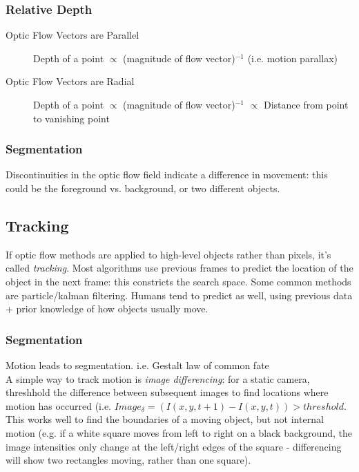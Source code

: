 \subsubsection{Relative Depth}
\begin{description}
    \item[Optic Flow Vectors are Parallel] Depth of a point $\propto$ (magnitude of flow vector)$^{-1}$ (i.e. motion parallax)
    \item[Optic Flow Vectors are Radial] Depth of a point $\propto$ (magnitude of flow vector)$^{-1}$ $\propto$ Distance from point to vanishing point
\end{description}

\subsubsection{Segmentation}
Discontinuities in the optic flow field indicate a difference in movement: this could be the foreground vs. background, or two different objects.

\subsection{Tracking}
If optic flow methods are applied to high-level objects rather than pixels, it's called \emph{tracking}. Most algorithms use previous frames to predict the location of the object in the next frame: this constricts the search space. Some common methods are particle/kalman filtering. Humans tend to predict as well, using previous data + prior knowledge of how objects usually move. 

\subsubsection{Segmentation}
Motion leads to segmentation. i.e. Gestalt law of common fate\\

A simple way to track motion is \emph{image differencing}: for a static camera, threshhold the difference between subsequent images to find locations where motion has occurred (i.e. $Image_\delta = (I(x,y,t+1) - I(x,y,t)) > threshold$. This works well to find the boundaries of a  moving object, but not internal motion (e.g. if a white square moves from left to right on a black background, the image intensities only change at the left/right edges of the square - differencing will show two rectangles moving, rather than one square).

